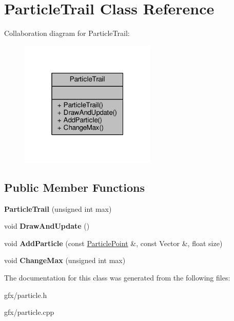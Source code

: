 \hypertarget{classParticleTrail}{}\section{Particle\+Trail Class Reference}
\label{classParticleTrail}


Collaboration diagram for Particle\+Trail\+:
\nopagebreak
\begin{figure}[H]
\begin{center}
\leavevmode
\includegraphics[width=184pt]{d6/d26/classParticleTrail__coll__graph}
\end{center}
\end{figure}
\subsection*{Public Member Functions}
\begin{DoxyCompactItemize}
\item 
{\bfseries Particle\+Trail} (unsigned int max)\hypertarget{classParticleTrail_afe5e4d07c377abd542e80129ec422b14}{}\label{classParticleTrail_afe5e4d07c377abd542e80129ec422b14}

\item 
void {\bfseries Draw\+And\+Update} ()\hypertarget{classParticleTrail_a41f0bdf058343b114d4478e59c9f29ff}{}\label{classParticleTrail_a41f0bdf058343b114d4478e59c9f29ff}

\item 
void {\bfseries Add\+Particle} (const \hyperlink{classParticlePoint}{Particle\+Point} \&, const Vector \&, float size)\hypertarget{classParticleTrail_a1b887afeca0ed454eab35a284d451075}{}\label{classParticleTrail_a1b887afeca0ed454eab35a284d451075}

\item 
void {\bfseries Change\+Max} (unsigned int max)\hypertarget{classParticleTrail_ad072ce1fb74c0337c07832e89fe25a86}{}\label{classParticleTrail_ad072ce1fb74c0337c07832e89fe25a86}

\end{DoxyCompactItemize}


The documentation for this class was generated from the following files\+:\begin{DoxyCompactItemize}
\item 
gfx/particle.\+h\item 
gfx/particle.\+cpp\end{DoxyCompactItemize}
